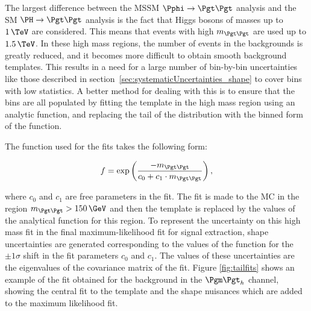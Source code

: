 The largest difference between the \ac{MSSM} $\Pphi\to\Pgt\Pgt$ analysis and the
\ac{SM} $\HToTauTau$ analysis is the fact that Higgs bosons of
masses up to $1\,\TeV$ are considered. This means that events with high $m_{\Pgt\Pgt}$
are used up to $1.5\,\TeV$. In these high mass regions, the
number of events in the backgrounds is greatly reduced, and it becomes more
difficult to obtain smooth background templates. This results in a need for a
large number of bin-by-bin uncertainties like those described in
section~\ref{sec:systematicUncertainties_shape} to cover bins with low
statistics. A better method for dealing with this is to ensure that the bins are
all populated by fitting the template in the high mass region using an analytic
function, and replacing the tail of the distribution with the binned form of the function.

The function used for the fits takes the following form:

\begin{equation}
f = \exp\left(\frac{-m_{\Pgt\Pgt}}{c_{0} + c_{1}\cdot m_{\Pgt\Pgt}}\right) ,
\end{equation}

where $c_{0}$ and $c_{1}$ are free parameters in the fit. The fit is made to
the \ac{MC} in the region $m_{\Pgt\Pgt} > 150\,\GeV$ and then the template is
replaced by the values of the analytical function for this region. To represent
the uncertainty on this high mass fit in the final maximum-likelihood fit for
signal extraction, shape uncertainties are generated corresponding to the 
values of the function for the $\pm1\sigma$ shift in the fit parameters $c_{0}$ 
and $c_{1}$. The values of these uncertainties are the 
eigenvalues of the covariance matrix of the fit. Figure \ref{fig:tailfits} shows
an example of the fit obtained for the \WJets background in the $\mutau$
channel, showing the central fit to the template and the shape nuisances which
are added to the maximum likelihood fit.

